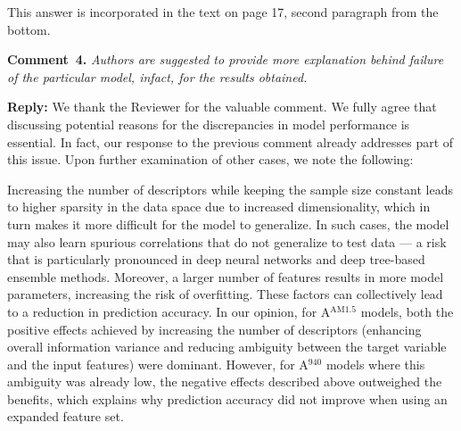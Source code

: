\documentclass[a4paper,fleqn]{cas-sc}
\begin{document}
This answer is incorporated in the text on page 17, second paragraph from the bottom.




\vspace{1cm}
\noindent
\textcolor[rgb]{0.00,0.50,1.00}{\textbf{Comment~4.}}
\emph{Authors are suggested to provide more explanation behind failure of the particular model, infact, for the results obtained.}

\noindent
\textcolor[rgb]{0.51,0.00,0.00}{\textbf{Reply:}}
We thank the Reviewer for the valuable comment.
We fully agree that discussing potential reasons for the discrepancies in model performance is essential.
In fact, our response to the previous comment already addresses part of this issue.
Upon further examination of other cases, we note the following:



Increasing the number of descriptors while keeping the sample size constant leads
to higher sparsity in the data space due to increased dimensionality,
which in turn makes it more difficult for the model to generalize.
In such cases, the model may also learn spurious correlations that do not generalize to test data ---
a risk that is particularly pronounced in deep neural networks and  deep tree-based ensemble methods.
Moreover, a larger number of features results in more model parameters, increasing the risk of overfitting.
These factors can collectively lead to a reduction in prediction accuracy.
In our opinion, for A$^\mathrm{AM1.5}$ models, both the positive effects achieved by increasing the number of descriptors
(enhancing overall information variance and reducing ambiguity between the target variable and the input features) were dominant.
However, for A$^\mathrm{940}$ models where this ambiguity was already low,
the negative effects described above outweighed the benefits,
which explains why prediction accuracy did not improve when using an expanded feature set.
\end{document}
